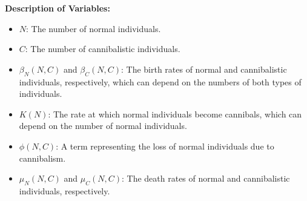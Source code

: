 \documentclass[12pt]{article}
\begin{document}
\textbf{Description of Variables:}
\begin{itemize}
    \item \(N\): The number of normal individuals.
    \item \(C\): The number of cannibalistic individuals.
    \item \(\beta_N(N, C)\) and \(\beta_C(N, C)\): The birth rates of normal and cannibalistic individuals, respectively, which can depend on the numbers of both types of individuals.
    \item \(K(N)\): The rate at which normal individuals become cannibals, which can depend on the number of normal individuals.
    \item \(\phi(N, C)\): A term representing the loss of normal individuals due to cannibalism.
    \item \(\mu_N(N, C)\) and \(\mu_C(N, C)\): The death rates of normal and cannibalistic individuals, respectively.
\end{itemize}
\end{document}
